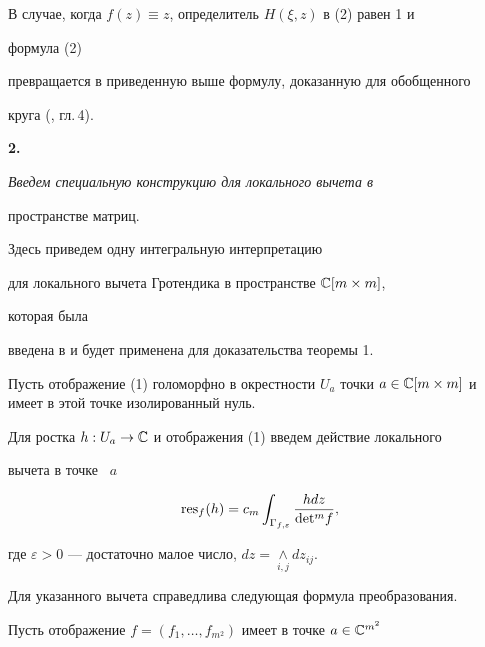  


В случае, когда $f(z)\equiv z$, определитель $H(\xi,z)$ в (2) равен 1 и 


формула (2) 


превращается в приведенную выше формулу, доказанную для обобщенного 


круга (\cite{1}, гл.\,4). 


\medskip 


 


{\bf 2.} {\it Введем специальную конструкцию для локального вычета в 


пространстве матриц.} Здесь приведем одну интегральную интерпретацию 


для локального вычета Гротендика в пространстве $\Bbb C[m\times m]$, 


которая была 


введена в \cite{4} и будет применена для доказательства теоремы 1. 


 


Пусть отображение (1) голоморфно в окрестности $U_a$ точки $a\in\Bbb 


C[m\times m]$ и имеет в этой точке изолированный нуль. 


 


\begin{defn} 


Для ростка $h:U_a\to\Bbb C$ и отображения (1) введем действие локального 


вычета в точке \ $a$ 


$$ 


\res\nolimits_f(h)=c_m\int_{\Gamma_{f,\varepsilon}} 


\frac{h d z}{\det{}^m f}, 


$$ 


где $\varepsilon>0$ --- достаточно малое число, $d 


z=\underset{i,j}{\wedge}{}d z_{i j}$. 


\end{defn} 


 


Для указанного вычета справедлива следующая формула преобразования. 


 


Пусть отображение $f=(f_1,\dotsc,f_{m^2})$ имеет в точке $a\in\Bbb C^{m^2}$ 


